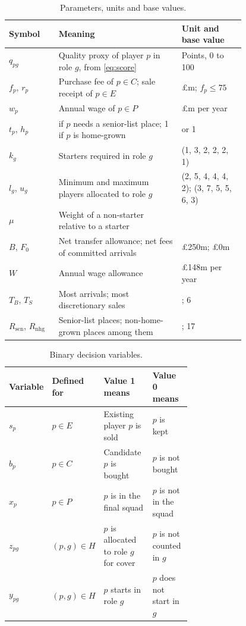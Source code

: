 \begin{table}[!htbp]
\centering
\caption{Parameters, units and base values.}\label{tab:parameters}
\begin{tabular}{@{}l >{\raggedright\arraybackslash}p{0.52\linewidth} >{\raggedright\arraybackslash}p{0.27\linewidth}@{}}
\toprule
Symbol & Meaning & Unit and base value \\
\midrule
$q_{pg}$ & Quality proxy of player $p$ in role $g$, from \eqref{eq:score} & Points, 0 to 100 \\
$f_p$, $r_p$ & Purchase fee of $p \in C$; sale receipt of $p \in E$ & \pounds m; $f_p \le 75$ \\
$w_p$ & Annual wage of $p \in P$ & \pounds m per year \\
$t_p$, $h_p$ & 1 if $p$ needs a senior-list place; 1 if $p$ is home-grown & 0 or 1 \\
$k_g$ & Starters required in role $g$ & (1, 3, 2, 2, 2, 1) \\
$l_g$, $u_g$ & Minimum and maximum players allocated to role $g$ & (2, 5, 4, 4, 4, 2); (3, 7, 5, 5, 6, 3) \\
$\mu$ & Weight of a non-starter relative to a starter & 0.3 \\
$B$, $F_0$ & Net transfer allowance; net fees of committed arrivals & \pounds 250m; \pounds 0m \\
$W$ & Annual wage allowance & \pounds 148m per year \\
$T_B$, $T_S$ & Most arrivals; most discretionary sales & 6; 6 \\
$R_{\mathrm{sen}}$, $R_{\mathrm{nhg}}$ & Senior-list places; non-home-grown places among them & 25; 17 \\
\bottomrule
\end{tabular}
\end{table}

\begin{table}[!htbp]
\centering
\caption{Binary decision variables.}\label{tab:variables}
\begin{tabular}{@{}l l >{\raggedright\arraybackslash}p{0.34\linewidth} >{\raggedright\arraybackslash}p{0.27\linewidth}@{}}
\toprule
Variable & Defined for & Value 1 means & Value 0 means \\
\midrule
$s_p$ & $p \in E$ & Existing player $p$ is sold & $p$ is kept \\
$b_p$ & $p \in C$ & Candidate $p$ is bought & $p$ is not bought \\
$x_p$ & $p \in P$ & $p$ is in the final squad & $p$ is not in the squad \\
$z_{pg}$ & $(p,g) \in H$ & $p$ is allocated to role $g$ for cover & $p$ is not counted in $g$ \\
$y_{pg}$ & $(p,g) \in H$ & $p$ starts in role $g$ & $p$ does not start in $g$ \\
\bottomrule
\end{tabular}
\end{table}

